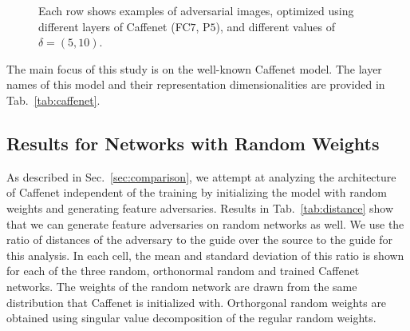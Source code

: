 \documentclass{article} %
\begin{document}
\begin{figure*}[h!]
\begin{tabular}
\hline
\end{tabular}
\caption{Each row shows examples of adversarial images, optimized
using different layers of Caffenet (FC$7$, P$5$), and different
values of $\delta=(5, 10)$.  }
\label{fig:adv_caffenet_page}
\vspace*{-0.1cm}
\end{figure*}%
The main focus of this study is on the well-known Caffenet model. The layer
names of this model and their representation dimensionalities are provided in
Tab.~\ref{tab:caffenet}.

\begin{table}[h!]
\caption{Caffenet layer dimensions.}
\label{tab:caffenet}
\end{table}\subsection{Results for Networks with Random Weights}
As described in Sec.~\ref{sec:comparison}, we attempt at analyzing the
architecture of Caffenet independent of the training by initializing the model
with random weights and generating feature adversaries. Results in
Tab.~\ref{tab:distance} show that we can generate feature adversaries on random
networks as well.  We use the ratio of distances of the adversary to the guide
over the source to the guide for this analysis. In each cell, the mean and
standard deviation of this ratio is shown for each of the three random,
orthonormal random and trained Caffenet networks.  The weights of the random
network are drawn from the same distribution that Caffenet is initialized with.
Orthorgonal random weights are obtained using singular value decomposition of the regular random weights.
\end{document}
